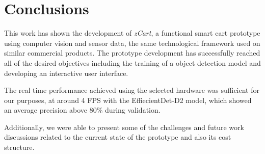 \chapter{Conclusions}\label{cap:conclusoeseperspectivas}

This work has shown the development of \textit{zCart}, a functional smart cart
prototype using computer vision and sensor data, the same technological
framework used on similar commercial products. The prototype development has
successfully reached all of the desired objectives including the training of a
object detection model and developing an interactive user interface.

The real time performance achieved using the selected hardware was sufficient
for our purposes, at around 4 FPS with the EffiecientDet-D2 model, which showed an
average precision above 80\% during validation.

Additionally, we were able to present some of the challenges and future work
discussions related to the current state of the prototype and also its cost
structure.
